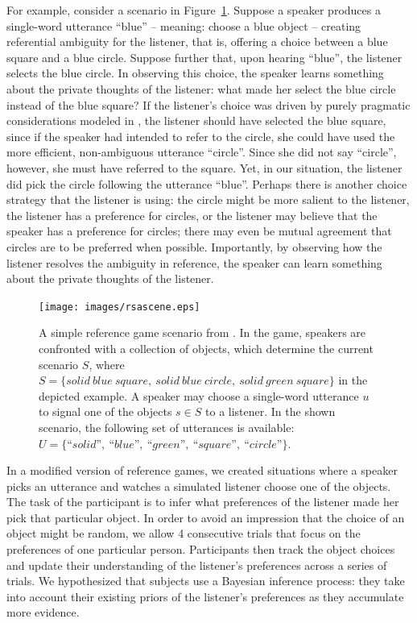 \documentclass[10pt,a4paper]{article}
\begin{document}
For example, consider a scenario in  Figure~\ref{FG-ref-game}. Suppose a speaker produces a single-word utterance ``blue'' -- meaning: choose a blue object -- creating referential ambiguity for the listener, that is, offering a choice between a blue square and a blue circle. 
Suppose further that, upon hearing ``blue'', the listener selects the blue circle.
In observing this choice, the speaker learns something about the private thoughts of the listener: what made her select the blue circle instead of the blue square? If the listener's choice was driven by purely pragmatic considerations modeled in , the listener should have selected the blue square, since if the speaker had intended to refer to the circle, she could have used the more efficient, non-ambiguous utterance ``circle''. Since she did not say ``circle'', however, she must have referred to the square. Yet, in our situation, the listener did pick the circle following the utterance ``blue''. Perhaps there is another choice strategy that the listener is using: the circle might be more salient to the listener, the listener has a preference for circles, or the listener may believe that the speaker has a preference for circles; there may even be mutual agreement that circles are to be preferred when possible. Importantly, by observing how the listener resolves the ambiguity in reference, the speaker can learn something about the private thoughts of the listener.

\begin{figure}
	\centering
	\texttt{[image: images/rsascene.eps]}
	\caption{A simple reference game scenario from \protect{}.
		In the game, speakers are confronted with a collection of objects, which determine the current scenario $S$, where $S=\{solid\ blue\ square,\ solid\ blue\ circle,\ solid\ green\ square\}$ in the depicted example. 
		A speaker may choose a single-word utterance $u$ to signal one of the objects $s\in S$ to a listener.
		In the shown scenario, the following set of utterances is available: $U =\{\textit{``solid''},\ \textit{``blue''},\ \textit{``green''},\ \textit{``square''},\ \textit{``circle''}\}$.
	}
	\label{FG-ref-game}
\end{figure}


In a modified version of reference games, we created situations where a speaker picks an utterance and watches a simulated listener choose one of the objects.
The task of the participant is to infer what preferences of the listener made her pick that particular object.
In order to avoid an impression that the choice of an object might be random, we allow 4 consecutive trials that focus on the preferences of one particular person.
Participants then track the object choices and update their understanding of the listener's preferences across a series of trials. 
We hypothesized that subjects use a Bayesian inference process: they take into account their existing priors of the listener's preferences as they accumulate more evidence.
\end{document}
